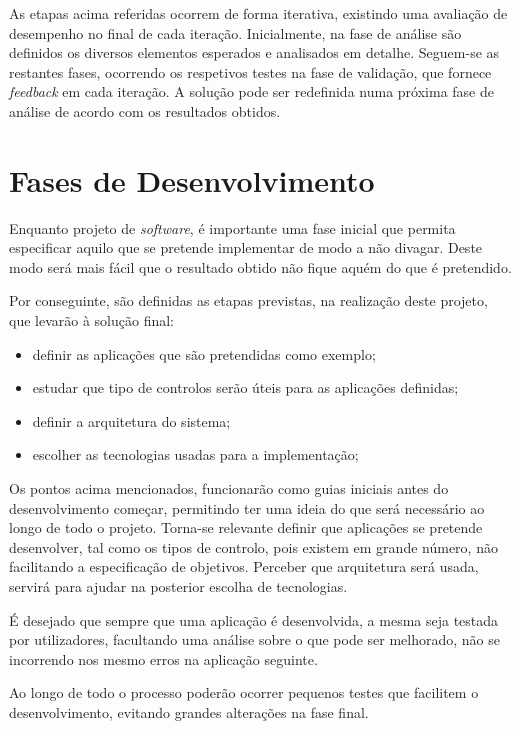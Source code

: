 As etapas acima referidas ocorrem de forma iterativa, existindo uma avaliação de desempenho no final de cada iteração. Inicialmente, na fase de análise são definidos os diversos elementos esperados e analisados em detalhe. Seguem-se as restantes fases, ocorrendo os respetivos testes na fase de validação, que fornece \textit{feedback} em cada iteração. A solução pode ser redefinida numa próxima fase de análise de acordo com os resultados obtidos. 




\section{Fases de Desenvolvimento}

	Enquanto projeto de \textit{software}, é importante uma fase inicial que permita especificar aquilo que se pretende implementar de modo a não divagar. Deste modo será mais fácil que o resultado obtido não fique aquém do que é pretendido.

	Por conseguinte, são definidas as etapas previstas, na realização deste projeto, que levarão à solução final:

	\begin{itemize}
		\item definir as aplicações que são pretendidas como exemplo;
		\item estudar que tipo de controlos serão úteis para as aplicações definidas;
		\item definir a arquitetura do sistema;
		\item escolher as tecnologias usadas para a implementação;
	\end{itemize}  

	Os pontos acima mencionados, funcionarão como guias iniciais antes do desenvolvimento começar, permitindo ter uma ideia do que será necessário ao longo de todo o projeto.
	Torna-se relevante definir que aplicações se pretende desenvolver, tal como os tipos de controlo, pois existem em grande número, não facilitando a especificação de objetivos. Perceber que arquitetura será usada, servirá para ajudar na posterior escolha de tecnologias.
	
	É desejado que sempre que uma aplicação é desenvolvida, a mesma seja testada por utilizadores, facultando uma análise sobre o que pode ser melhorado, não se incorrendo nos mesmo erros na aplicação seguinte.

	Ao longo de todo o processo poderão ocorrer pequenos testes que facilitem o desenvolvimento, evitando grandes alterações na fase final. 


